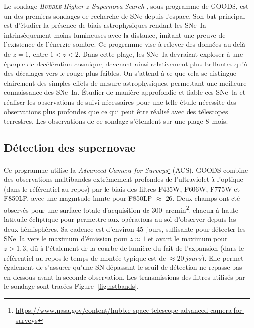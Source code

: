 \documentclass[../main/main.tex]{subfiles}
\begin{document}
Le sondage \textit{\textsc{Hubble} Higher $z$ Supernova
Search} \citep[HHZSS,][]{strolger2004}, sous-programme de GOODS, est un des
premiers sondages de recherche de SNe depuis l'espace. Son but principal est
d'étudier la présence de biais astrophysiques rendant les SNe~Ia intrinsèquement
moins lumineuses avec la distance, imitant une preuve de l'existence de
l'énergie sombre. Ce programme vise à relever des données au-delà de $z = 1$,
entre $1 < z < 2$. Dans cette plage, les SNe~Ia devraient exploser à une époque
de décélération cosmique, devenant ainsi relativement plus brillantes qu'à des
décalages vers le rouge plus faibles. On s'attend à ce que cela se distingue
clairement des simples effets de mesure astrophysiques, permettant une meilleure
connaissance des SNe~Ia. Étudier de manière approfondie et fiable ces SNe~Ia et
réaliser les observations de suivi nécessaires pour une telle étude nécessite
des observations plus profondes que ce qui peut être réalisé avec des télescopes
terrestres. Les observations de ce sondage s'étendent sur une plage
\SI{8}{mois}.

\subsection{Détection des supernovae}\label{ssec:hstdetec}

Ce programme utilise la \textit{Advanced Camera for
Surveys}\footnote{\href{https://www.nasa.gov/content/hubble-space-telescope-advanced-camera-for-surveys}
{https://www.nasa.gov/content/hubble-space-telescope-advanced-camera-for-surveys}}
(ACS). GOODS combine des observations multibandes extrêmement profondes de
l'ultraviolet à l'optique (dans le référentiel au repos) par le biais des
filtres F435W, F606W, F775W et F850LP, avec une magnitude limite pour F850LP
$\approx$ 26. Deux champs ont été observés pour une surface totale d'acquisition
de \SI{300}{arcmin^2}, chacun à haute latitude écliptique pour permettre aux
opérations au sol d'observer depuis les deux hémisphères. Sa cadence est
d'environ \SI{45}{jours}, suffisante pour détecter les SNe~Ia vers le maximum
d'émission pour $z \approx 1$ et avant le maximum pour $z > 1,3$, dû à
l'étalement de la courbe de lumière du fait de l'expansion (dans le référentiel
au repos le temps de montée typique est de $\approx \SI{20}{jours}$). Elle
permet également de s'assurer qu'une SN dépassant le seuil de détection ne
repasse pas en-dessous avant la seconde observation. Les transmissions des
filtres utilisés par le sondage sont tracées Figure~\ref{fig:hstbands}.
\end{document}
